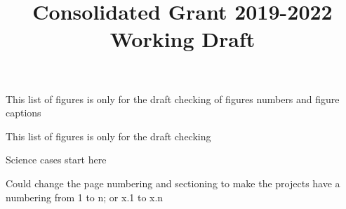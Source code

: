 \documentclass[11pt,a4paper]{article}
\title{Consolidated Grant 2019-2022 Working Draft}
\begin{document}

\ifcgdraft
    \layoutpagecheck
\fi



\newpage
\clearpage

\ifcgdebug








  
  \newpage

\fi


%
%
\newpage



\setcounter{tocdepth}{2}
\ifcgdebug
  \setcounter{tocdepth}{3}
\fi

\tableofcontents
\newpage

\ifcgdraft
    This list of figures is only for the draft checking of figures numbers and figure captions
    
    \listoffigures
    \newpage
    
    This list of figures is only for the draft checking
    
    \listoftables
    \newpage
    
Science cases start here

Could change the page numbering and sectioning to make the
projects have a numbering from 1 to n; or x.1 to x.n

\newpage


\newpage
\end{document}
